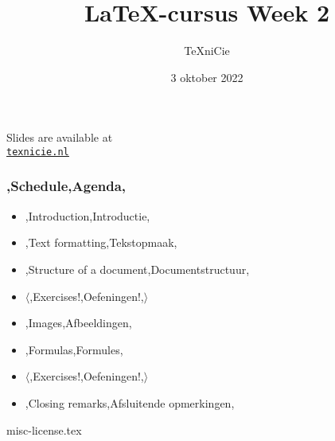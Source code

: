 \documentclass[dutch,everyoneauthor]{../../cursuspresentatie}
\title{\LaTeX{}-cursus Week 2}
\author{\TeX niCie}
\date{3 oktober 2022}
\def\importslide#1#2{%
	{#2}
}
\begin{document}

\begin{frame}
	\titlepage
	\centering

	Slides are available at\\
	\href{https://texnicie.nl}{\ul{\texttt{texnicie.nl}}}
\end{frame}

\begin{frame}
	\frametitle{\lang,Schedule,Agenda,}
	
	\begin{itemize}
		\item \lang,Introduction,Introductie,
		\item \lang,Text formatting,Tekstopmaak,
		\item \lang,Structure of a document,Documentstructuur,
		\item $ \langle $\lang,Exercises!,Oefeningen!,$ \rangle $
		\item \lang,Images,Afbeeldingen,
		\item \lang,Formulas,Formules,
		\item $ \mathbf\langle $\lang,Exercises!,Oefeningen!,$ \rangle $
		\item \lang,Closing remarks,Afsluitende opmerkingen,
	\end{itemize}
\end{frame}

% 

% 

% 

% 

% 


% 

\importslide{misc}{misc-license.tex}
	
\end{document}
